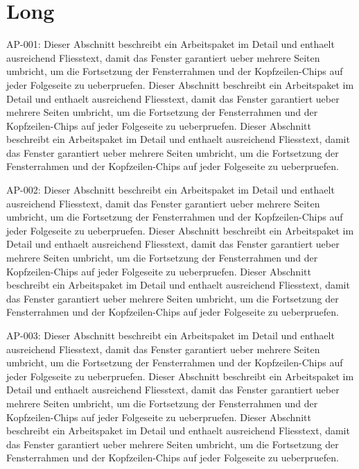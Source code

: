 \documentclass[type=report,theme=light,language=de]{semio}
\begin{document}
\chapter{Long}
\begin{Table}[title=Lange Tabelle]
AP-001: Dieser Abschnitt beschreibt ein Arbeitspaket im Detail und enthaelt ausreichend Fliesstext, damit das Fenster garantiert ueber mehrere Seiten umbricht, um die Fortsetzung der Fensterrahmen und der Kopfzeilen-Chips auf jeder Folgeseite zu ueberpruefen. Dieser Abschnitt beschreibt ein Arbeitspaket im Detail und enthaelt ausreichend Fliesstext, damit das Fenster garantiert ueber mehrere Seiten umbricht, um die Fortsetzung der Fensterrahmen und der Kopfzeilen-Chips auf jeder Folgeseite zu ueberpruefen. Dieser Abschnitt beschreibt ein Arbeitspaket im Detail und enthaelt ausreichend Fliesstext, damit das Fenster garantiert ueber mehrere Seiten umbricht, um die Fortsetzung der Fensterrahmen und der Kopfzeilen-Chips auf jeder Folgeseite zu ueberpruefen. 

AP-002: Dieser Abschnitt beschreibt ein Arbeitspaket im Detail und enthaelt ausreichend Fliesstext, damit das Fenster garantiert ueber mehrere Seiten umbricht, um die Fortsetzung der Fensterrahmen und der Kopfzeilen-Chips auf jeder Folgeseite zu ueberpruefen. Dieser Abschnitt beschreibt ein Arbeitspaket im Detail und enthaelt ausreichend Fliesstext, damit das Fenster garantiert ueber mehrere Seiten umbricht, um die Fortsetzung der Fensterrahmen und der Kopfzeilen-Chips auf jeder Folgeseite zu ueberpruefen. Dieser Abschnitt beschreibt ein Arbeitspaket im Detail und enthaelt ausreichend Fliesstext, damit das Fenster garantiert ueber mehrere Seiten umbricht, um die Fortsetzung der Fensterrahmen und der Kopfzeilen-Chips auf jeder Folgeseite zu ueberpruefen. 

AP-003: Dieser Abschnitt beschreibt ein Arbeitspaket im Detail und enthaelt ausreichend Fliesstext, damit das Fenster garantiert ueber mehrere Seiten umbricht, um die Fortsetzung der Fensterrahmen und der Kopfzeilen-Chips auf jeder Folgeseite zu ueberpruefen. Dieser Abschnitt beschreibt ein Arbeitspaket im Detail und enthaelt ausreichend Fliesstext, damit das Fenster garantiert ueber mehrere Seiten umbricht, um die Fortsetzung der Fensterrahmen und der Kopfzeilen-Chips auf jeder Folgeseite zu ueberpruefen. Dieser Abschnitt beschreibt ein Arbeitspaket im Detail und enthaelt ausreichend Fliesstext, damit das Fenster garantiert ueber mehrere Seiten umbricht, um die Fortsetzung der Fensterrahmen und der Kopfzeilen-Chips auf jeder Folgeseite zu ueberpruefen. 


\end{Table}
\end{document}
